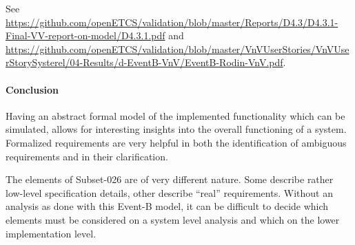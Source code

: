 See {\url{https://github.com/openETCS/validation/blob/master/Reports/D4.3/D4.3.1-Final-VV-report-on-model/D4.3.1.pdf}} and {\url{https://github.com/openETCS/validation/blob/master/VnVUserStories/VnVUserStorySysterel/04-Results/d-EventB-VnV/EventB-Rodin-VnV.pdf}}.





\paragraph{Conclusion}

Having an abstract formal model of the implemented functionality which can be
simulated, allows for interesting insights into the overall functioning of a
system. Formalized requirements are very helpful in both the identification of
ambiguous requirements and in their clarification.

The elements of Subset-026 are of very different nature. Some describe rather
low-level specification details, other describe ``real'' requirements. Without
an analysis as done with this Event-B model, it can be difficult to decide which
elements must be considered on a system level analysis and which on the lower
implementation level.

